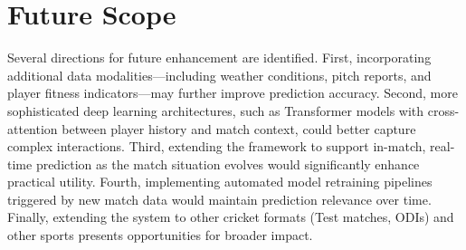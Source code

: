 \documentclass[conference]{IEEEtran}
\begin{document}
\section{Future Scope}
Several directions for future enhancement are identified. First, incorporating additional data modalities—including weather conditions, pitch reports, and player fitness indicators—may further improve prediction accuracy. Second, more sophisticated deep learning architectures, such as Transformer models with cross-attention between player history and match context, could better capture complex interactions. Third, extending the framework to support in-match, real-time prediction as the match situation evolves would significantly enhance practical utility. Fourth, implementing automated model retraining pipelines triggered by new match data would maintain prediction relevance over time. Finally, extending the system to other cricket formats (Test matches, ODIs) and other sports presents opportunities for broader impact.
\end{document}
